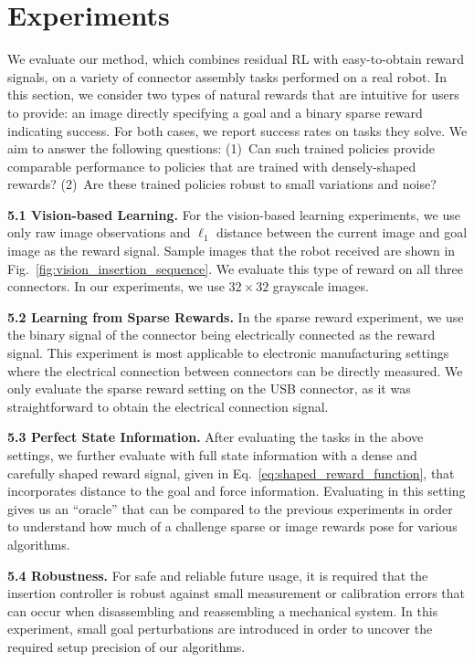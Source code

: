 \section{Experiments}\label{sec:experiments}

We evaluate our method, which combines residual RL with easy-to-obtain reward signals, on a variety of connector assembly tasks performed on a real robot. In this section, we consider two types of natural rewards that are intuitive for users to provide: an image directly specifying a goal and a binary sparse reward indicating success. For both cases, we report success rates on tasks they solve.  We aim to answer the following questions:  (1)~Can such trained policies provide comparable performance to policies that are trained with densely-shaped rewards? (2)~Are these trained policies robust to small variations and noise? 

\textbf{5.1 Vision-based Learning.} For the vision-based learning experiments, we use only raw image observations and $\ell_1$ distance between the current image and goal image as the reward signal. Sample images that the robot received are shown in Fig.~\ref{fig:vision_insertion_sequence}. We evaluate this type of reward on all three connectors. In our experiments, we use $32 \times 32$ grayscale images. 

\textbf{5.2 Learning from Sparse Rewards.} In the sparse reward experiment, we use the binary signal of the connector being electrically connected as the reward signal. This experiment is most applicable to electronic manufacturing settings where the electrical connection between connectors can be directly measured. We only evaluate the sparse reward setting on the USB connector, as it was straightforward to obtain the electrical connection signal.

\textbf{5.3 Perfect State Information.} After evaluating the tasks in the above settings, we further evaluate with full state information with a dense and carefully shaped reward signal, given in Eq.~\ref{eq:shaped_reward_function}, that incorporates distance to the goal and force information. Evaluating in this setting gives us an ``oracle'' that can be compared to the previous experiments in order to understand how much of a challenge sparse or image rewards pose for various algorithms.

\textbf{5.4 Robustness.} For safe and reliable future usage, it is required that the insertion controller is robust against small measurement or calibration errors that can occur when disassembling and reassembling a mechanical system. In this experiment, small goal perturbations are introduced in order to uncover the required setup precision of our algorithms. 


